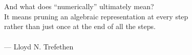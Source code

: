 \chapter*{\ }

\begin{flushright}
  And what does ``numerically'' ultimately mean?\\
  It means pruning an algebraic representation at every step\\
  rather than just once at the end of all the steps.\\
  \ \\
  --- Lloyd N. Trefethen
\end{flushright}
